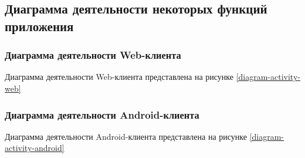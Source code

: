 \subsection{Диаграмма деятельности некоторых функций приложения}\label{subsec:2-activity-diagram}\indent


\subsubsection{Диаграмма деятельности Web-клиента}\indent

Диаграмма деятельности Web-клиента представлена на рисунке \ref{diagram-activity-web}


\subsubsection{Диаграмма деятельности Android-клиента}\indent

Диаграмма деятельности Android-клиента представлена на рисунке \ref{diagram-activity-android}
\break